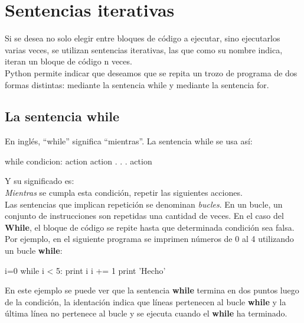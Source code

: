 \section{Sentencias iterativas}

Si se desea no solo elegir entre bloques de código a ejecutar, sino ejecutarlos varias veces, se utilizan sentencias iterativas, las que como su nombre indica, iteran un bloque de código n veces.\\

Python permite indicar que deseamos que se repita un trozo de programa de dos formas distintas: mediante la sentencia while y mediante la sentencia for. 

\subsection{La sentencia while}

En inglés, ``while'' significa ``mientras''. La sentencia while se usa así:\\

\begin{pyglist} [language=python]
while condicion:
    action
    action
    .
    .
    .
    action
\end{pyglist}

Y su significado es:\\

\textit{Mientras} se cumpla esta condición, repetir las siguientes acciones.\\

Las sentencias que implican repetición se denominan \textit{bucles}. En un bucle, un conjunto de instrucciones son repetidas una cantidad de veces. En el caso del \textbf{While}, el bloque de código se repite hasta que determinada condición sea falsa.\\

Por ejemplo, en el siguiente programa se imprimen números de 0 al 4 utilizando un bucle \textbf{while}:\\

\begin{pyglist} [language=python]
i=0
while i < 5:
    print i
    i += 1
print 'Hecho'
\end{pyglist}

En este ejemplo se puede ver que la sentencia \textbf{while} termina en dos puntos luego de la condición, la identación indica que líneas pertenecen al bucle \textbf{while} y la última línea no pertenece al bucle y se ejecuta cuando el \textbf{while} ha terminado.

